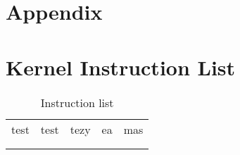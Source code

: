 \section{Appendix}

\appendix
\section{Kernel Instruction List}
\label{sec:KernelInstructionList}

\begin{table}[]
	\centering
	\caption{Instruction list}
	\label{InstructionList}
	\begin{tabular}{lllll}

		test & test & tezy & ea & mas \\
		&  &  &  &  \\
		&  &  &  & 
	\end{tabular}
\end{table}

